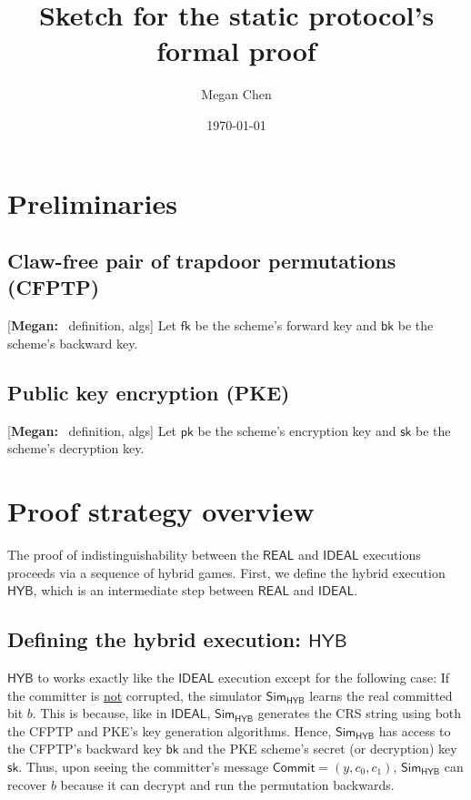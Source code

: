 \documentclass{article}[12pt]
\title{Sketch for the \cite{CanettiF01} static protocol's formal proof}
\author{Megan Chen}
\date{\today}
\newcommand{\authnote}[2]{[{\color{red}\textbf{#1:}}~{\color{blue} #2}]}
\newcommand{\authnote}[2]{}
\newcommand{\megan}[1]{\authnote{Megan}{#1}}
\newcommand{\CommitMsg}{\mathsf{Commit}}
\newcommand{\EncKey}{\mathsf{pk}}
\newcommand{\DecKey}{\mathsf{sk}}
\newcommand{\ForwKey}{\mathsf{fk}}
\newcommand{\BackKey}{\mathsf{bk}}
\newcommand{\Simulator}{{\mathsf{Sim}}} %
\newcommand{\Ideal}{{\mathsf{IDEAL}}}
\newcommand{\Hyb}{{\mathsf{HYB}}}
\newcommand{\Real}{{\mathsf{REAL}}}
\begin{document}
\maketitle
\tableofcontents

\section{Preliminaries}

\subsection{Claw-free pair of trapdoor permutations (CFPTP)}
\megan{definition, algs}
Let $\ForwKey$ be the scheme's forward key and $\BackKey$ be the scheme's backward key.

\subsection{Public key encryption (PKE)}
\megan{definition, algs}
Let $\EncKey$ be the scheme's encryption key and $\DecKey$ be the scheme's decryption key.

\section{Proof strategy overview}

The proof of indistinguishability between the $\Real$ and $\Ideal$ executions proceeds via a sequence of hybrid games. First, we define the hybrid execution $\Hyb$, which is an intermediate step between $\Real$ and $\Ideal$.

\subsection{Defining the hybrid execution: $\Hyb$}

$\Hyb$ to works exactly like the $\Ideal$ execution except for the following case: If the committer is \underline{not} corrupted, the simulator $\Simulator_{\Hyb}$ learns the real committed bit $b$. This is because, like in $\Ideal$, $\Simulator_{\Hyb}$ generates the CRS string using both the CFPTP and PKE's key generation algorithms. Hence, $\Simulator_{\Hyb}$ has access to the CFPTP's backward key $\BackKey$ and the PKE scheme's secret (or decryption) key $\DecKey$. Thus, upon seeing the committer's message $\CommitMsg = (y, c_0, c_1)$, $\Simulator_{\Hyb}$ can recover $b$ because it can decrypt and run the permutation backwards.
\end{document}
